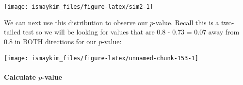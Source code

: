 \documentclass[]{tufte-book}
\newenvironment{Shaded}{\begin{snugshade}}{\end{snugshade}}
\newcommand{\KeywordTok}[1]{\textcolor[rgb]{0.13,0.29,0.53}{\textbf{{#1}}}}
\newcommand{\DataTypeTok}[1]{\textcolor[rgb]{0.13,0.29,0.53}{{#1}}}
\newcommand{\DecValTok}[1]{\textcolor[rgb]{0.00,0.00,0.81}{{#1}}}
\newcommand{\FloatTok}[1]{\textcolor[rgb]{0.00,0.00,0.81}{{#1}}}
\newcommand{\StringTok}[1]{\textcolor[rgb]{0.31,0.60,0.02}{{#1}}}
\newcommand{\NormalTok}[1]{{#1}}
\begin{document}
\begin{Shaded}
\end{Shaded}

\begin{center}\texttt{[image: ismaykim\_files/figure-latex/sim2-1]} \end{center}

We can next use this distribution to observe our \(p\)-value. Recall
this is a two-tailed test so we will be looking for values that are 0.8
- 0.73 = 0.07 away from 0.8 in BOTH directions for our \(p\)-value:

\begin{Shaded}
\end{Shaded}

\begin{center}\texttt{[image: ismaykim\_files/figure-latex/unnamed-chunk-153-1]} \end{center}

\paragraph{\texorpdfstring{Calculate
\(p\)-value}{Calculate p-value}}\label{calculate-p-value-1}
\end{document}
